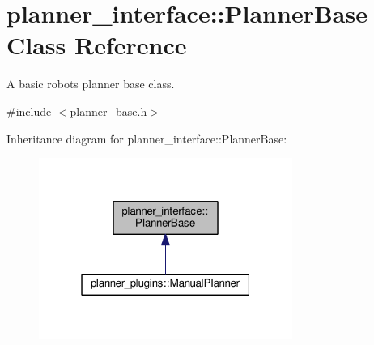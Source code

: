 \hypertarget{classplanner__interface_1_1PlannerBase}{}\section{planner\+\_\+interface\+:\+:Planner\+Base Class Reference}
\label{classplanner__interface_1_1PlannerBase}


A basic robot\textquotesingle{}s planner base class.  




{\ttfamily \#include $<$planner\+\_\+base.\+h$>$}



Inheritance diagram for planner\+\_\+interface\+:\+:Planner\+Base\+:\nopagebreak
\begin{figure}[H]
\begin{center}
\leavevmode
\includegraphics[width=235pt]{classplanner__interface_1_1PlannerBase__inherit__graph}
\end{center}
\end{figure}
